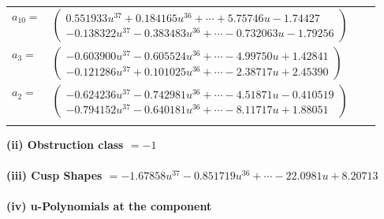 \documentclass[1p]{elsarticle_modified}
\theoremstyle{definition}
\begin{document}
\begin{tabular}{m{7pt} m{180pt} m{7pt} m{180pt} }
\flushright $a_{10}=$&$\begin{pmatrix}0.551933 u^{37}+0.184165 u^{36}+\cdots+5.75746 u-1.74427\\-0.138322 u^{37}-0.383483 u^{36}+\cdots-0.732063 u-1.79256\end{pmatrix}$ \\
\flushright $a_{3}=$&$\begin{pmatrix}-0.603900 u^{37}-0.605524 u^{36}+\cdots-4.99750 u+1.42841\\-0.121286 u^{37}+0.101025 u^{36}+\cdots-2.38717 u+2.45390\end{pmatrix}$ \\
\flushright $a_{2}=$&$\begin{pmatrix}-0.624236 u^{37}-0.742981 u^{36}+\cdots-4.51871 u-0.410519\\-0.794152 u^{37}-0.640181 u^{36}+\cdots-8.11717 u+1.88051\end{pmatrix}$\\&\end{tabular}
\flushleft \textbf{(ii) Obstruction class $= -1$}\\~\\
\flushleft \textbf{(iii) Cusp Shapes $= -1.67858 u^{37}-0.851719 u^{36}+\cdots-22.0981 u+8.20713$}\\~\\
\newpage\renewcommand{\arraystretch}{1}
\flushleft \textbf{(iv) u-Polynomials at the component}\newline \\
\end{document}
